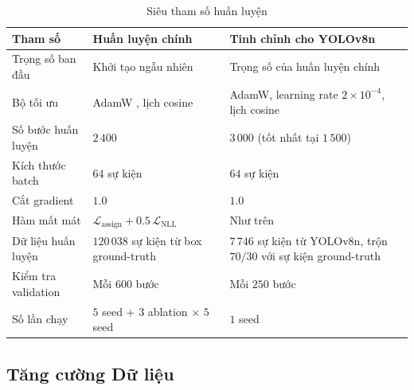 \begin{table}[H]
    \centering
    \caption{Siêu tham số huấn luyện}
    \label{tab:train_hparams}
    \begin{tabularx}{\textwidth}{l X X}
        \toprule
        \textbf{Tham số} & \textbf{Huấn luyện chính} & \textbf{Tinh chỉnh cho YOLOv8n} \\
        \midrule
        Trọng số ban đầu & Khởi tạo ngẫu nhiên & Trọng số của huấn luyện chính \\
        Bộ tối ưu & AdamW \cite{loshchilov2019adamw}, lịch cosine & AdamW, learning rate $2\times10^{-4}$, lịch cosine \\
        Số bước huấn luyện & $2\,400$ & $3\,000$ (tốt nhất tại $1\,500$) \\
        Kích thước batch & $64$ sự kiện & $64$ sự kiện \\
        Cắt gradient & $1.0$ & $1.0$ \\
        Hàm mất mát & $\mathcal{L}_{\text{assign}} + 0.5\,\mathcal{L}_{\text{NLL}}$ & Như trên \\
        Dữ liệu huấn luyện & $120\,038$ sự kiện từ box ground-truth & $7\,746$ sự kiện từ YOLOv8n, trộn $70/30$ với sự kiện ground-truth \\
        Kiểm tra validation & Mỗi $600$ bước & Mỗi $250$ bước \\
        Số lần chạy & $5$ seed + $3$ ablation $\times$ $5$ seed & $1$ seed \\
        \bottomrule
    \end{tabularx}
\end{table}

\subsection{Tăng cường Dữ liệu}
\label{sec:data_augmentation}

